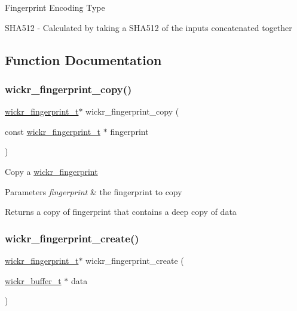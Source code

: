 Fingerprint Encoding Type

S\+H\+A512 -\/ Calculated by taking a S\+H\+A512 of the inputs concatenated together 

\subsection{Function Documentation}
\mbox{\label{group__wickr__fingerprint_gac2497b535d0864b0fcc91004a979a313}} 
\subsubsection{\texorpdfstring{wickr\+\_\+fingerprint\+\_\+copy()}{wickr\_fingerprint\_copy()}}
{\footnotesize\ttfamily \mbox{\hyperlink{structwickr__fingerprint}{wickr\+\_\+fingerprint\+\_\+t}}$\ast$ wickr\+\_\+fingerprint\+\_\+copy (\begin{DoxyParamCaption}\item[{const \mbox{\hyperlink{structwickr__fingerprint}{wickr\+\_\+fingerprint\+\_\+t}} $\ast$}]{fingerprint }\end{DoxyParamCaption})}

Copy a \mbox{\hyperlink{structwickr__fingerprint}{wickr\+\_\+fingerprint}}


\begin{DoxyParams}{Parameters}
{\em fingerprint} & the fingerprint to copy \\
\hline
\end{DoxyParams}
\begin{DoxyReturn}{Returns}
a copy of \textquotesingle{}fingerprint\textquotesingle{} that contains a deep copy of \textquotesingle{}data\textquotesingle{} 
\end{DoxyReturn}
\mbox{\label{group__wickr__fingerprint_ga6041cfce95478334c8e046ad88c3d166}} 
\subsubsection{\texorpdfstring{wickr\+\_\+fingerprint\+\_\+create()}{wickr\_fingerprint\_create()}}
{\footnotesize\ttfamily \mbox{\hyperlink{structwickr__fingerprint}{wickr\+\_\+fingerprint\+\_\+t}}$\ast$ wickr\+\_\+fingerprint\+\_\+create (\begin{DoxyParamCaption}\item[{\mbox{\hyperlink{structwickr__buffer}{wickr\+\_\+buffer\+\_\+t}} $\ast$}]{data }\end{DoxyParamCaption})}

